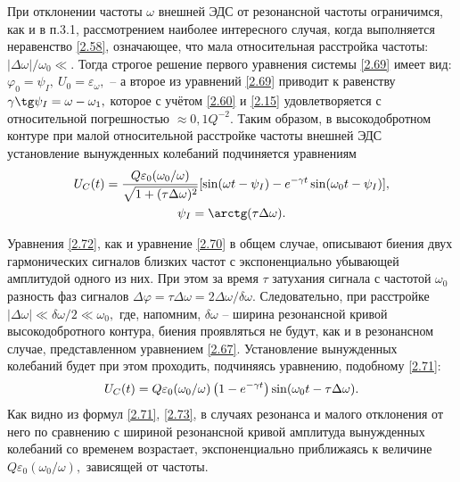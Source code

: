 При отклонении частоты $\omega$ внешней ЭДС от резонансной частоты   ограничимся, как и в п.3.1, рассмотрением наиболее интересного случая, когда выполняется неравенство \eqref{2.58}, означающее, что мала относительная расстройка частоты: $|\Delta\omega|/\omega_0\ll.$ Тогда строгое решение первого уравнения системы \eqref{2.69} имеет вид: $\varphi_0=\psi_I,~U_0=\varepsilon_{\omega},$ – а второе из уравнений \eqref{2.69} приводит к равенству $\gamma\tg\psi_I=\omega-\omega_1,$ которое с учётом \eqref{2.60} и \eqref{2.15} удовлетворяется с относительной погрешностью $\approx0,1Q^{-2}.$ Таким образом, в высокодобротном контуре при малой относительной расстройке частоты внешней ЭДС установление вынужденных колебаний подчиняется уравнениям
\begin{equation}
	\eqmark{2.72}
	\begin{gathered}[c]
		U_C(t)=\dfrac{Q\varepsilon_0(\omega_0/\omega)}{\sqrt{1+(\tau\Delta\omega)^2}}[\sin(\omega t-\psi_I)-e^{-\gamma t}\sin(\omega_0t-\psi_I)],\\
		\psi_I=\arctg(\tau\Delta\omega).
	\end{gathered}
\end{equation}

Уравнения \eqref{2.72}, как и уравнение \eqref{2.70} в общем случае, описывают биения двух гармонических сигналов близких частот с экспоненциально убывающей амплитудой одного из них. При этом за время $\tau$ затухания сигнала с частотой $\omega_0$ разность фаз сигналов $\Delta\varphi=\tau\Delta\omega=2\Delta\omega/\delta\omega.$ Следовательно, при расстройке $|\Delta\omega|\ll\delta\omega/2\ll\omega_0,$ где, напомним, $\delta\omega$ – ширина резонансной кривой высокодобротного контура, биения проявляться не будут, как и в резонансном случае, представленном уравнением \eqref{2.67}. Установление вынужденных колебаний будет при этом проходить, подчиняясь уравнению, подобному \eqref{2.71}:
\begin{equation}\eqmark{2.73}
	U_C(t)=Q\varepsilon_0(\omega_0/\omega)\left(1-e^{-\gamma t}\right)\sin(\omega_0t-\tau\Delta\omega).
\end{equation}
Как видно из формул \eqref{2.71}, \eqref{2.73}, в случаях резонанса и малого отклонения от него по сравнению с шириной резонансной кривой амплитуда вынужденных колебаний со временем возрастает, экспоненциально приближаясь к величине \\$Q\varepsilon_0(\omega_0/\omega),$ зависящей от частоты. 

